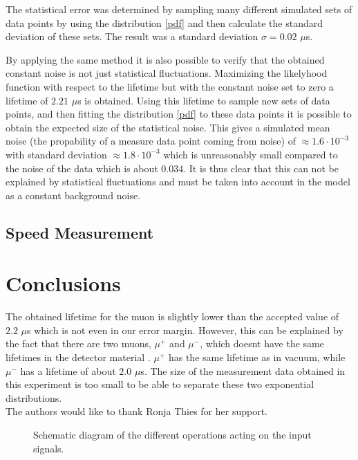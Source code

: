 \documentclass[10pt,twocolumn]{article}
\begin{document}
The statistical error was determined by sampling many different simulated sets of data points by using the distribution \eqref{pdf} and then calculate the standard deviation of these sets. The result was a standard deviation $\sigma=0.02$ $\mu$s. \newline

By applying the same method it is also possible to verify that the obtained constant noise is not just statistical fluctuations. Maximizing the likelyhood function with respect to the lifetime but with the constant noise set to zero a lifetime of $2.21$ $\mu$s is obtained. Using this lifetime to sample new sets of data points, and then fitting the distribution \eqref{pdf} to these data points it is possible to obtain the expected size of the statistical noise. This gives a simulated mean noise (the propability of a measure data point coming from noise) of $\approx1.6\cdot 10^{-3}$ with standard deviation $\approx1.8\cdot 10^{-3}$ which is unreasonably small compared to the noise of the data which is about $0.034$. It is thus clear that this can not be explained by statistical fluctuations and must be taken into account in the model as a constant background noise.

\subsection{Speed Measurement}


\section{Conclusions}
The obtained lifetime for the muon is slightly lower than the accepted value of $2.2$ $\mu$s which is not even in our error margin. However, this can be explained by the fact that there are two muons, $\mu^+$ and $\mu^-$, which doesnt have the same lifetimes in the detector material \cite{}. $\mu^+$ has the same lifetime as in vacuum, while $\mu^-$ has a lifetime of about $2.0$ $\mu$s. The size of the measurement data obtained in this experiment is too small to be able to separate these two exponential distributions.\\

The authors would like to thank Ronja Thies for her support.



\begin{figure}[h]

\caption{\label{setup} Schematic diagram of the different operations acting on the input signals.}
\end{figure}
\end{document}
